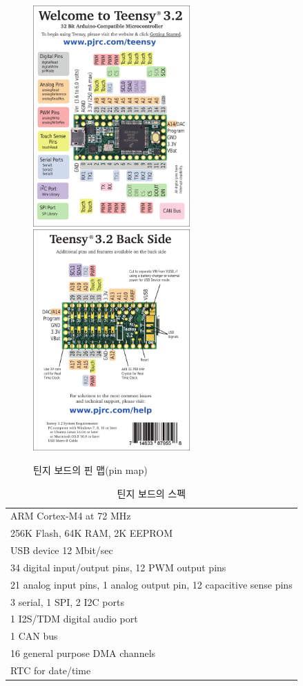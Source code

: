 \begin{figure}[H]
    \centering
    \includegraphics[width=6cm]{images/Teensy3.2 - 1.pdf}
    \includegraphics[width=6cm]{images/Teensy3.2 - 2.pdf}
    \caption{틴지 보드의 핀 맵(pin map)}
    \label{fig:enter-label}
\end{figure}

\begin{table}[H]
    \centering
    \caption{틴지 보드의 스펙}
    \begin{tabular}{l}
        \hline
        ARM Cortex-M4 at 72 MHz\\
        256K Flash, 64K RAM, 2K EEPROM\\
        USB device 12 Mbit/sec\\
        34 digital input/output pins, 12 PWM output pins\\
        21 analog input pins, 1 analog output pin, 12 capacitive sense pins\\
        3 serial, 1 SPI, 2 I2C ports\\
        1 I2S/TDM digital audio port\\
        1 CAN bus\\
        16 general purpose DMA channels\\
        RTC for date/time\\
        \hline
    \end{tabular}
    \label{Specification of Teensy Board}
\end{table}

